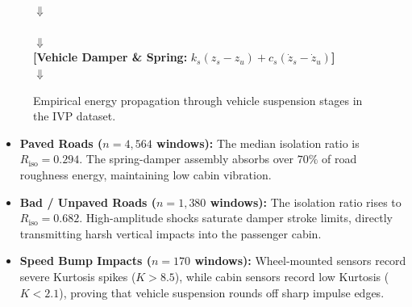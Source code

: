 \begin{figure}[htbp]
\centering
\small
\begin{tcolorbox}[colback=gray!5,colframe=gray!50,arc=1mm,title=\textbf{Flowchart 3: Multi-Mount Suspension Energy Transmission Architecture}]
\begin{center}
 \\
$\Downarrow$ \\
 \\
$\Downarrow$ \\
\textbf{[Vehicle Damper \& Spring: } $k_s(z_s - z_u) + c_s(\dot{z}_s - \dot{z}_u)$\textbf{]} \\
$\Downarrow$ \\
\end{center}
\end{tcolorbox}
\caption{Empirical energy propagation through vehicle suspension stages in the IVP dataset.}
\label{fig:suspension_flowchart}
\end{figure}

\begin{itemize}
    \item \textbf{Paved Roads ($n = 4,564$ windows):} The median isolation ratio is $R_{\text{iso}} = 0.294$. The spring-damper assembly absorbs over $70\%$ of road roughness energy, maintaining low cabin vibration.
    \item \textbf{Bad / Unpaved Roads ($n = 1,380$ windows):} The isolation ratio rises to $R_{\text{iso}} = 0.682$. High-amplitude shocks saturate damper stroke limits, directly transmitting harsh vertical impacts into the passenger cabin.
    \item \textbf{Speed Bump Impacts ($n = 170$ windows):} Wheel-mounted sensors record severe Kurtosis spikes ($K > 8.5$), while cabin sensors record low Kurtosis ($K < 2.1$), proving that vehicle suspension rounds off sharp impulse edges.
\end{itemize}

